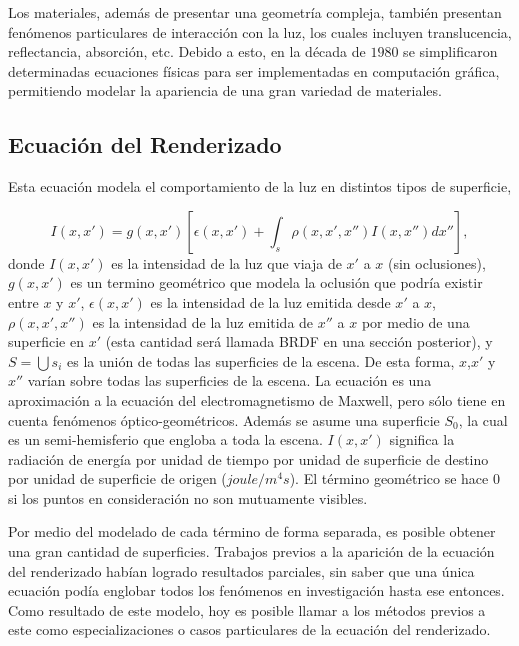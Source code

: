 Los materiales, además de presentar una geometría compleja, también presentan fenómenos particulares de interacción con la luz, los cuales incluyen translucencia, reflectancia, absorción, etc.
Debido a esto, en la década de $1980$ se simplificaron determinadas ecuaciones físicas para ser implementadas en computación gráfica, permitiendo modelar la apariencia de una gran variedad de materiales.

\subsection{Ecuación del Renderizado}

Esta ecuación modela el comportamiento de la luz en distintos tipos de superficie,

\begin{equation}
I(x,x') =  g(x,x')  \left[ \epsilon(x,x') + \int_{s}{\rho(x,x',x'')I(x,x'') dx''} \right],
\end{equation}
donde $I(x,x')$ es la intensidad de la luz que viaja de $x'$ a $x$ (sin oclusiones), $g(x,x')$ es un termino geométrico que modela la oclusión que podría existir entre $x$ y $x'$, $\epsilon(x,x')$ es la intensidad de la luz emitida desde $x'$ a $x$, $\rho(x,x',x'')$ es la intensidad de la luz emitida de $x''$ a $x$ por medio de una superficie en $x'$ (esta cantidad será llamada BRDF en una sección posterior), y $S=\bigcup{s_{i}}$ es la unión de todas las superficies de la escena.
De esta forma, $x$,$x'$ y $x''$ varían sobre todas las superficies de la escena.
La ecuación es una aproximación a la ecuación del electromagnetismo de Maxwell, pero sólo tiene en cuenta fenómenos óptico-geométricos.
Además se asume una superficie $S_{0}$, la cual es un semi-hemisferio que engloba a toda la escena.
$I(x,x')$ significa la radiación de energía por unidad de tiempo por unidad de superficie de destino por unidad de superficie de origen ($joule/m^{4} s$).
El término geométrico se hace $0$ si los puntos en consideración no son mutuamente visibles.

Por medio del modelado de cada término de forma separada, es posible obtener una gran cantidad de superficies.
Trabajos previos a la aparición de la ecuación del renderizado habían logrado resultados parciales, sin saber que una única ecuación podía englobar todos los fenómenos en investigación hasta ese entonces.
Como resultado de este modelo, hoy es posible llamar a los métodos previos a este como especializaciones o casos particulares de la ecuación del renderizado.

